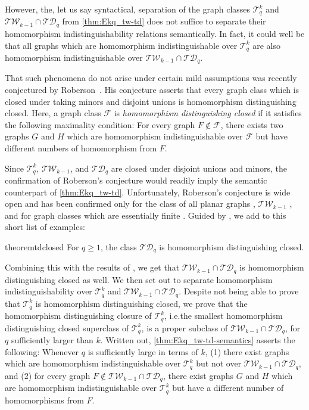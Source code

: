 \documentclass[10pt,a4paper]{article}
\newcommand{\TW}{\ensuremath{\mathcal{TW}}}
\newcommand{\TD}{\ensuremath{\mathcal{TD}}}
\newcommand{\Ekq}{\ensuremath{\mathcal{T}_{q}^{k}}}
\begin{document}
However, the, let us say syntactical, separation of the graph classes $\Ekq$ and $\mathcal{TW}_{k-1} \cap \mathcal{TD}_q$ from \cref{thm:Ekq_tw-td} does not suffice to separate their homomorphism indistinguishability relations semantically. In fact, it could well be that all graphs which are homomorphism indistinguishable over $\Ekq$ are also homomorphism indistinguishable over $\mathcal{TW}_{k-1} \cap \mathcal{TD}_q$.

That such phenomena do not arise under certain mild assumptions was recently conjectured by Roberson~\cite{roberson_oddomorphisms_2022}. His conjecture asserts that every graph class which is closed under taking minors and disjoint unions is homomorphism distinguishing closed. Here, a graph class $\mathcal{F}$ is \emph{homomorphism distinguishing closed} if it satisfies the following maximality condition: For every graph $F \not\in \mathcal{F}$, there exists two graphs $G$ and $H$ which are homomorphism indistinguishable over $\mathcal{F}$ but have different numbers of homomorphism from $F$.

Since $\Ekq$, $\mathcal{TW}_{k-1}$, and $\mathcal{TD}_q$ are closed under disjoint unions and minors, the confirmation of Roberson's conjecture would readily imply the semantic counterpart of \cref{thm:Ekq_tw-td}. Unfortunately, Roberson's conjecture is wide open and has been confirmed only for the class of all planar graphs \cite{roberson_oddomorphisms_2022}, $\mathcal{TW}_{k-1}$ \cite{neuen_homomorphism-distinguishing_2023}, and for graph classes which are essentially finite \cite{seppelt_logical_2023}. Guided by \cite{neuen_homomorphism-distinguishing_2023}, we add to this short list of examples:

\begin{restatable}{theorem}{tdclosed}
	\label{thm:td-closed}
	For $q \geq 1$, the class $\mathcal{TD}_q$ is homomorphism distinguishing closed.
\end{restatable}

Combining this with the results of \cite{neuen_homomorphism-distinguishing_2023}, we get that $\TW_{k-1}\cap\TD_q$ is homomorphism distinguishing closed as well.
We then set out to separate homomorphism indistinguishability over $\Ekq$ and $\TW_{k-1}\cap\TD_q$.
Despite not being able to prove that $\Ekq$ is homomorphism distinguishing closed, we prove that the homomorphism distinguishing closure of $\Ekq$, i.e.\@ the smallest homomorphism distinguishing closed superclass of $\Ekq$, is a proper subclass of $\TW_{k-1}\cap\TD_q$, for $q$ sufficiently larger than $k$.
Written out, \cref{thm:Ekq_tw-td-semantics} asserts the following:
Whenever $q$ is sufficiently large in terms of $k$,
(1) there exist graphs which are homomorphism indistinguishable over $\Ekq$ but not over $\TW_{k-1}\cap\TD_q$, and
(2) for every graph $F \not\in \mathcal{TW}_{k-1} \cap \mathcal{TD}_q$, there exist graphs $G$ and $H$ which are homomorphism indistinguishable over $\Ekq$ but have a different number of homomorphisms from $F$.
\end{document}

